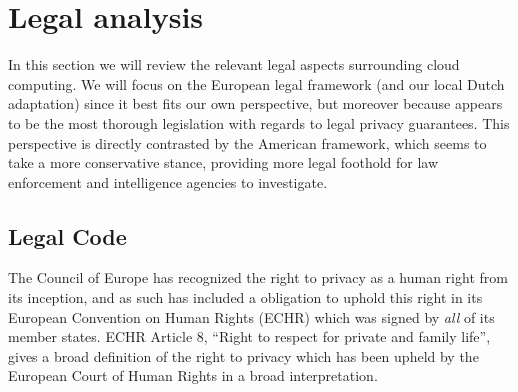 \documentclass[11pt, a4paper]{article}
\begin{document}


\section{Legal analysis}
\label{sec:legal_analysis}

In this section we will review the relevant legal aspects surrounding cloud computing.
We will focus on the European legal framework (and our local Dutch adaptation) since it best fits our own perspective, but moreover because appears to be the most thorough legislation with regards to legal privacy guarantees.
This perspective is directly contrasted by the American framework, which seems to take a more conservative stance, providing more legal foothold for law enforcement and intelligence agencies to investigate.

\subsection{Legal Code}
The Council of Europe has recognized the right to privacy as a human right from its inception, and as such has included a obligation to uphold this right in its European Convention on Human Rights (ECHR) which was signed by \emph{all} of its member states.
ECHR Article 8, ``Right to respect for private and family life'', gives a broad definition of the right to privacy which has been upheld by the European Court of Human Rights in a broad interpretation.
\end{document}
